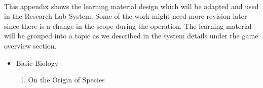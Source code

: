 \documentclass[12pt,oneside,openright,a4paper]{cpe-english-project}
\begin{document}
 \label{appendix:learning-material} \\
This appendix shows the learning material design which will be adapted and used in the Research Lab System. Some of the work might need more revision later since there is a change in the scope during the operation. The learning material will be grouped into a topic as we described in the system details under the game overview section.

\begin{itemize}
	\item Basic Biology
	\begin{enumerate}
		\item On the Origin of Species \\
		\begin{minipage}[c]{\textwidth}\centering {}  \end{minipage}
		\begin{minipage}[c]{\textwidth}\centering {}  \end{minipage}

\end{enumerate}
\end{itemize}
\end{document}
